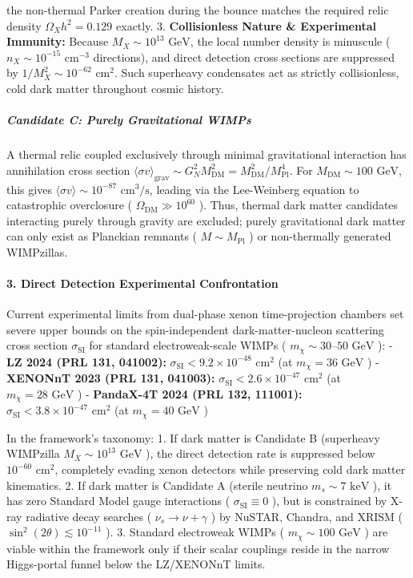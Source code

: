 \documentclass[11pt,a4paper]{article}
\theoremstyle{definition}\newtheorem{definition}{Definition}
\theoremstyle{remark}\newtheorem{remark}{Remark}
\begin{document}
the non-thermal Parker creation during the bounce matches the required relic density $\Omega_X h^2 = 0.129$ exactly.
3. \textbf{Collisionless Nature \& Experimental Immunity:} Because $M_X \sim 10^{13}\text{ GeV}$, the local number density is minuscule ( $n_X \sim 10^{-15}\text{ cm}^{-3}$ directions), and direct detection cross sections are suppressed by $1/M_X^2 \sim 10^{-62}\text{ cm}^2$. Such superheavy condensates act as strictly collisionless, cold dark matter throughout cosmic history.
\subparagraph{Candidate C: Purely Gravitational WIMPs}

A thermal relic coupled exclusively through minimal gravitational interaction has annihilation cross section $\langle \sigma v \rangle_{\text{grav}} \sim G_N^2 M_{\text{DM}}^2 = M_{\text{DM}}^2 / M_{\text{Pl}}^4$. For $M_{\text{DM}} \sim 100\text{ GeV}$, this gives $\langle \sigma v \rangle \sim 10^{-87}\text{ cm}^3/\text{s}$, leading via the Lee-Weinberg equation to catastrophic overclosure ( $\Omega_{\text{DM}} \gg 10^{60}$ ). Thus, thermal dark matter candidates interacting purely through gravity are excluded; purely gravitational dark matter can only exist as Planckian remnants ( $M \sim M_{\text{Pl}}$ ) or non-thermally generated WIMPzillas.
\paragraph{3. Direct Detection Experimental Confrontation}

Current experimental limits from dual-phase xenon time-projection chambers set severe upper bounds on the spin-independent dark-matter-nucleon scattering cross section $\sigma_{\text{SI}}$ for standard electroweak-scale WIMPs ( $m_\chi \sim 30\text{--}50\text{ GeV}$ ):
- \textbf{LZ 2024 (PRL 131, 041002):} $\sigma_{\text{SI}} < 9.2 \times 10^{-48}\text{ cm}^2$ (at $m_\chi = 36\text{ GeV}$ )
- \textbf{XENONnT 2023 (PRL 131, 041003):} $\sigma_{\text{SI}} < 2.6 \times 10^{-47}\text{ cm}^2$ (at $m_\chi = 28\text{ GeV}$ )
- \textbf{PandaX-4T 2024 (PRL 132, 111001):} $\sigma_{\text{SI}} < 3.8 \times 10^{-47}\text{ cm}^2$ (at $m_\chi = 40\text{ GeV}$ )

In the framework's taxonomy:
1. If dark matter is Candidate B (superheavy WIMPzilla $M_X \sim 10^{13}\text{ GeV}$ ), the direct detection rate is suppressed below $10^{-60}\text{ cm}^2$, completely evading xenon detectors while preserving cold dark matter kinematics.
2. If dark matter is Candidate A (sterile neutrino $m_s \sim 7\text{ keV}$ ), it has zero Standard Model gauge interactions ( $\sigma_{\text{SI}} \equiv 0$ ), but is constrained by X-ray radiative decay searches ( $\nu_s \to \nu + \gamma$ ) by NuSTAR, Chandra, and XRISM ( $\sin^2(2\theta) \lesssim 10^{-11}$ ).
3. Standard electroweak WIMPs ( $m_\chi \sim 100\text{ GeV}$ ) are viable within the framework only if their scalar couplings reside in the narrow Higgs-portal funnel below the LZ/XENONnT limits.
\end{document}
